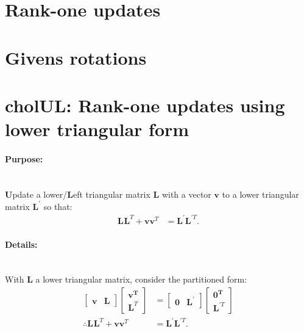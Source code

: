 \documentclass[oneside,english]{scrbook}
\begin{document}
\section{Rank-one updates}

\section{Givens rotations}


\section{cholUL: Rank-one updates using lower triangular form}

\paragraph{Purpose:}~\\
\textbf{U}pdate a lower/\textbf{L}eft triangular matrix
$\bm{L}$ with a vector $\bm{v}$ to a lower triangular matrix
$\bm{L}^{'}$ so that:
\begin{align*}
    \bm{L}^{}\bm{L}^{T}+\bm{v}\bm{v}^T &= \bm{L}^{'}\bm{L}^{'T}.
\end{align*}

\paragraph{Details:}~\\
With $\bm{L}$ a lower triangular matrix, consider the partitioned form:
\begin{align*}
    \begin{bmatrix}
    \bm{v} & \bm{L}
  \end{bmatrix}
    \begin{bmatrix}
      \bm{v^T} \\
      \bm{L}^{T}
  \end{bmatrix}
  &=
    \begin{bmatrix}
    \bm{0} & \bm{L}^{'}
  \end{bmatrix}
    \begin{bmatrix}
      \bm{0^T} \\
      \bm{L}^{'T}
  \end{bmatrix}\\
    \therefore
    \bm{L}^{}\bm{L}^{T}+\bm{v}\bm{v}^T
    &=
    \bm{L}^{'}\bm{L}^{'T}.
\end{align*}
\end{document}
